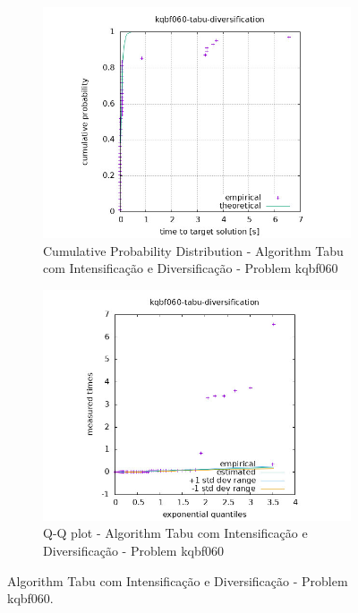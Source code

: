 \begin{figure}[H]
    \centering
    \begin{subfigure}{0.49\textwidth}
        \includegraphics[width=\textwidth]{figure/ttt_plot/kqbf060-tabu-diversification-exp.jpeg}
        \caption{Cumulative Probability Distribution - Algorithm Tabu com Intensificação e Diversificação - Problem kqbf060}
        \label{fig:tabu-com intensificação e diversificação-kqbf060-exp}
    \end{subfigure}
    \hfill
    \begin{subfigure}{0.49\textwidth}
        \includegraphics[width=\textwidth]{figure/ttt_plot/kqbf060-tabu-diversification-qq.jpeg}
        \caption{Q-Q plot - Algorithm Tabu com Intensificação e Diversificação - Problem kqbf060}
        \label{fig:tabu-com intensificação e diversificação-kqbf060-qq}
    \end{subfigure}
    \caption{Algorithm Tabu com Intensificação e Diversificação - Problem kqbf060.}
    \label{fig:tabu-com intensificação e diversificação-kqbf060}
\end{figure}


